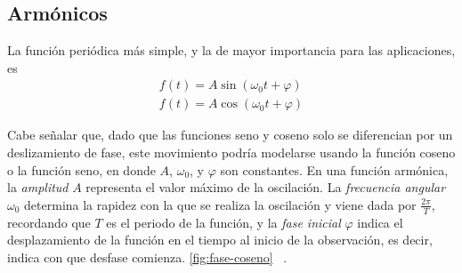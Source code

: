\subsection{Armónicos}
La función periódica más simple, y la de mayor importancia para las aplicaciones, es
\begin{equation}
	\begin{split}
		f(t) = A \sin(\omega_0 t + \varphi) \\
		f(t) = A \cos(\omega_0 t + \varphi) 
	\end{split}
\end{equation}

Cabe señalar que, dado que las funciones seno y coseno solo se diferencian por un deslizamiento de fase, este movimiento podría modelarse usando la función coseno o la función seno, en donde \(A\), \(\omega_0\), y \(\varphi\) son constantes. En una función armónica, la \textit{amplitud} \(A\) representa el valor máximo de la oscilación. La \textit{frecuencia angular} \(\omega_0\) determina la rapidez con la que se realiza la oscilación y viene dada por $\frac{2\pi}{T}$, recordando que $T$ es el periodo de la función, y la \textit{fase inicial} \(\varphi\) indica el desplazamiento de la función en el tiempo al inicio de la observación, es decir, indica con que desfase comienza. \ref{fig:fase-coseno} ~\cite{armonicosOpenStax}. 

